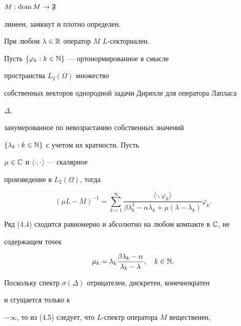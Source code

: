 $M:\operatorname{dom} M\to \frak F$ 


линеен, замкнут и плотно определен. 


 


\begin{lemm} При любом $\lambda\in\Bbb R$ оператор $M$ $L$-секториален. 


\end{lemm} 


 


\begin{pf} Пусть $\{\varphi_k:k\in\Bbb N\}$ --- ортонормированное в смысле 


пространства $L_2(\Omega)$ множество 


собственных векторов однородной задачи Дирихле для оператора Лапласа 


$\Delta$, 


занумерованное по невозрастанию собственных значений 


$\{\lambda_k:k\in \Bbb N\}$ с учетом их кратности. Пусть 


$\mu\in\Bbb C$ и $\langle\cdot,\cdot\rangle$ --- скалярное 


произведение в $L_2(\Omega)$, тогда 


\begin{equation} 


(\mu L-M)^{-1}=\sum^\infty_{k=1} 


\frac{\langle\cdot,\varphi_k\rangle} 


{\beta\lambda^2_k-\alpha\lambda_k+\mu(\lambda-\lambda_k)}\varphi_k. 


\end{equation} 


Ряд (4.4) сходится равномерно и абсолютно на любом компакте в $\Bbb C$, не 


содержащем точек 


\begin{equation} 


\mu_k=\lambda_k\frac{\beta\lambda_k-\alpha} 


{\lambda_k-\lambda},\quad k\in\Bbb N. 


\end{equation} 


Поскольку спектр $\sigma(\Delta)$ отрицателен, дискретен, конечнократен 


и сгущается только к 


$-\infty$, то из (4.5) следует, что $L$-спектр оператора $M$ вещественен, 



\end{pf}
